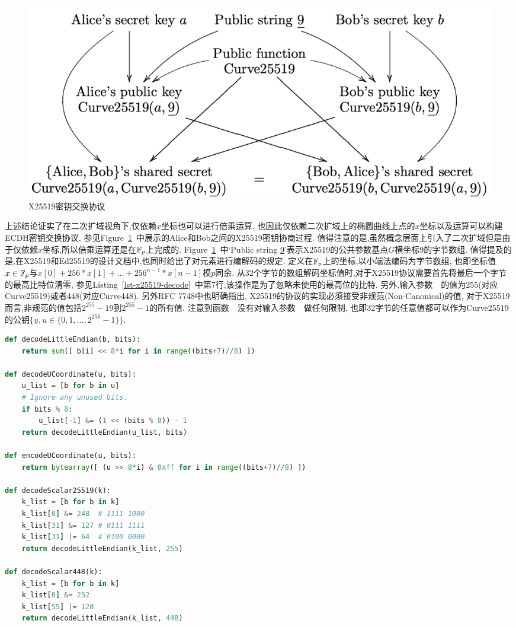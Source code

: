 \begin{figure}[h]
\centering
\includegraphics[width=.8\textwidth]{x25519.png}
\caption{X25519密钥交换协议}\label{fig-x25519}
\end{figure}

上述结论证实了在二次扩域视角下,仅依赖$x$坐标也可以进行倍乘运算,
也因此仅依赖二次扩域上的椭圆曲线上点的$x$坐标以及运算可以构建ECDH密钥交换协议,
参见Figure~\ref{fig-x25519}~中展示的Alice和Bob之间的X25519密钥协商过程.
值得注意的是,虽然概念层面上引入了二次扩域但是由于仅依赖$x$坐标,所以倍乘运算还是在$\mathbb{F}_p$上完成的.
Figure~\ref{fig-x25519}~中`Public string \underline{9}'表示X25519的公共参数基点$G$横坐标9的字节数组.
值得提及的是,在X25519和Ed25519的设计文档中,也同时给出了对元素进行编解码的规定.
定义在$\mathbb{F}_p$上的坐标,以小端法编码为字节数组,
也即坐标值$x\in\mathbb{F}_p$与$x[0] + 256  *x[1] + \ldots + 256^{n-1} * x[n-1]$模$p$同余.
从32个字节的数组解码坐标值时,对于X25519协议需要首先将最后一个字节的最高比特位清零,
参见Listing~\ref{lst-x25519-decode}~中第7行,该操作是为了忽略未使用的最高位的比特.
另外,输入参数~~的值为255(对应Curve25519)或者448(对应Curve448).
另外RFC 7748中也明确指出, X25519的协议的实现必须接受非规范(Non-Canonical)的值,
对于X25519而言,非规范的值包括$2^{255}-19$到$2^{255}-1$的所有值.
注意到函数~~没有对输入参数~~做任何限制,
也即32字节的任意值都可以作为Curve25519的公钥$\{\underline{u}, u\in \{0,1,\ldots,2^{256}-1\}\}$.

\begin{lstlisting}[language=python, caption=X25519和X448的编解码, label=lst-x25519-decode]
def decodeLittleEndian(b, bits):
    return sum([ b[i] << 8*i for i in range((bits+7)//8) ])

def decodeUCoordinate(u, bits):
    u_list = [b for b in u]
    # Ignore any unused bits.
    if bits % 8:
        u_list[-1] &= (1 << (bits % 8)) - 1
    return decodeLittleEndian(u_list, bits)

def encodeUCoordinate(u, bits):
    return bytearray([ (u >> 8*i) & 0xff for i in range((bits+7)//8) ])

def decodeScalar25519(k):
    k_list = [b for b in k]
    k_list[0] &= 248  # 1111 1000
    k_list[31] &= 127 # 0111 1111
    k_list[31] |= 64  # 0100 0000
    return decodeLittleEndian(k_list, 255)

def decodeScalar448(k):
    k_list = [b for b in k]
    k_list[0] &= 252
    k_list[55] |= 128
    return decodeLittleEndian(k_list, 448)
\end{lstlisting}

